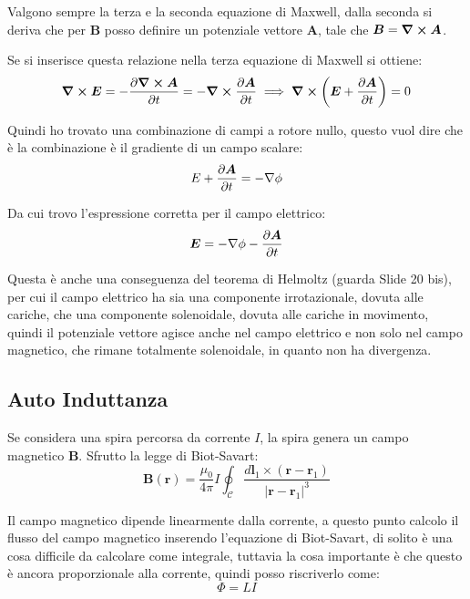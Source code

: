\documentclass[a4paper]{scrarticle}
\begin{document}
Valgono sempre la terza e la seconda equazione di Maxwell, dalla seconda si deriva che per $\bm B$ posso definire un potenziale vettore $\bm A$, tale che $\bm B = \curl \bm A$.

Se si inserisce questa relazione nella terza equazione di Maxwell si ottiene:
\begin{equation}
    \curl \bm E = - \pdv{\curl \bm A}{t} = -\curl \pdv{\bm A}{t}\implies \curl \left(\bm E + \pdv{\bm A}{t}\right)= 0
\end{equation}

Quindi ho trovato una combinazione di campi a rotore nullo, questo vuol dire che è la combinazione è il gradiente di un campo scalare:
\begin{equation}
    E + \pdv{\bm A}{t} = - \nabla \phi
\end{equation}

Da cui trovo l'espressione corretta per il campo elettrico:
\begin{equation}
    \bm E = - \nabla \phi - \pdv{\bm A}{t}
\end{equation}

Questa è anche una conseguenza del teorema di Helmoltz (guarda Slide 20 bis), per cui il campo elettrico ha sia una componente irrotazionale, dovuta alle cariche, che una componente solenoidale, dovuta alle cariche in movimento, quindi il potenziale vettore agisce anche nel campo elettrico e non solo nel campo magnetico, che rimane totalmente solenoidale, in quanto non ha divergenza.

\subsection{Auto Induttanza}

Se considera una spira percorsa da corrente $I$, la spira genera un campo magnetico $\bm B$. Sfrutto la legge di Biot-Savart:
\begin{equation*}
    \bm B(\bm r) = \frac{\mu_0}{4\pi} I \oint_{\mathcal{C}} \frac{d\bm l_1 \times (\bm r - \bm r_1)}{\left|\bm r - \bm r_1\right|^3}
\end{equation*}

Il campo magnetico dipende linearmente dalla corrente, a questo punto calcolo il flusso del campo magnetico inserendo l'equazione di Biot-Savart, di solito è una cosa difficile da calcolare come integrale, tuttavia la cosa importante è che questo è ancora proporzionale alla corrente, quindi posso riscriverlo come:
\begin{equation}
    \varPhi = LI
\end{equation}
\end{document}
